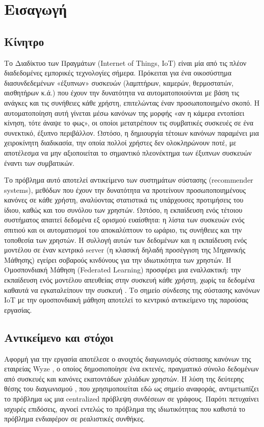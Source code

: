 \chapter{Εισαγωγή}\label{ch:intro}

\section{Κίνητρο}\label{sec:intro-motivation}
Το Διαδίκτυο των Πραγμάτων (Internet of Things, IoT) είναι μία από τις πλέον διαδεδομένες εμπορικές τεχνολογίες σήμερα. Πρόκειται για ένα οικοσύστημα διασυνδεδεμένων «έξυπνων» συσκευών (λαμπτήρων, καμερών, θερμοστατών, αισθητήρων κ.ά.) που έχουν την δυνατότητα να αυτοματοποιούνται με βάση τις ανάγκες και τις συνήθειες κάθε χρήστη, επιτελώντας έναν προσωποποιημένο σκοπό. Η αυτοματοποίηση αυτή γίνεται μέσω κανόνων της μορφής «αν η κάμερα εντοπίσει κίνηση, τότε άναψε το φως», οι οποίοι μετατρέπουν τις συμβατικές συσκευές σε ένα συνεκτικό, έξυπνο περιβάλλον. Ωστόσο, η δημιουργία τέτοιων κανόνων παραμένει μια χειροκίνητη διαδικασία, την οποία πολλοί χρήστες δεν ολοκληρώνουν ποτέ, με αποτέλεσμα να μην αξιοποιείται το σημαντικό πλεονέκτημα των έξυπνων συσκευών έναντι των συμβατικών.

Το πρόβλημα αυτό αποτελεί αντικείμενο των συστημάτων σύστασης (recommender systems), μεθόδων που έχουν την δυνατότητα να προτείνουν προσωποποιημένους κανόνες σε κάθε χρήστη, αναλύοντας στατιστικά τις υπάρχουσες προτιμήσεις του ίδιου, καθώς και του συνόλου των χρηστών. Ωστόσο, η εκπαίδευση ενός τέτοιου συστήματος απαιτεί δεδομένα εξ ορισμού ευαίσθητα: η λίστα των συσκευών ενός σπιτιού και οι αυτοματισμοί του αποκαλύπτουν το ωράριο, τις συνήθειες και την τοποθεσία των χρηστών. Η συλλογή αυτών των δεδομένων και η εκπαίδευση ενός μοντέλου σε έναν κεντρικό server (η κλασική δηλαδή προσέγγιση της Μηχανικής Μάθησης) εγείρει σοβαρούς κινδύνους για την ιδιωτικότητα των χρηστών. Η Ομοσπονδιακή Μάθηση (Federated Learning) προσφέρει μια εναλλακτική: την εκπαίδευση ενός μοντέλου απευθείας στην συσκευή κάθε χρήστη, χωρίς τα δεδομένα καθαυτά να εγκαταλείπουν την συσκευή \cite{mcmahan_communication-efficient_2017}. Το σημείο σύνδεσης της σύστασης κανόνων IoT με την ομοσπονδιακή μάθηση αποτελεί το κεντρικό αντικείμενο της παρούσας εργασίας.

\section{Αντικείμενο και στόχοι}\label{sec:intro-goal}
Αφορμή για την εργασία αποτέλεσε ο ανοιχτός διαγωνισμός σύστασης κανόνων της εταιρείας Wyze \cite{noauthor_wyzelabsrulerecommendation_nodate}, ο οποίος δημοσιοποίησε ένα εκτενές, πραγματικό σύνολο δεδομένων από συσκευές και κανόνες εκατοντάδων χιλιάδων χρηστών. Η λύση της δεύτερης θέσης του διαγωνισμού \cite{conti_conti748wyze-rule-recommendation_2024}, που χρησιμοποιείται εδώ ως σημείο αναφοράς, αντιμετωπίζει το πρόβλημα ως μια centralized πρόβλεψη συνδέσεων σε γράφους. Παρότι πετυχαίνει ισχυρές επιδόσεις, αγνοεί εντελώς το πρόβλημα της ιδιωτικότητας που καθιστά το πρόβλημα ενδιαφέρον σε ρεαλιστικές συνθήκες.

